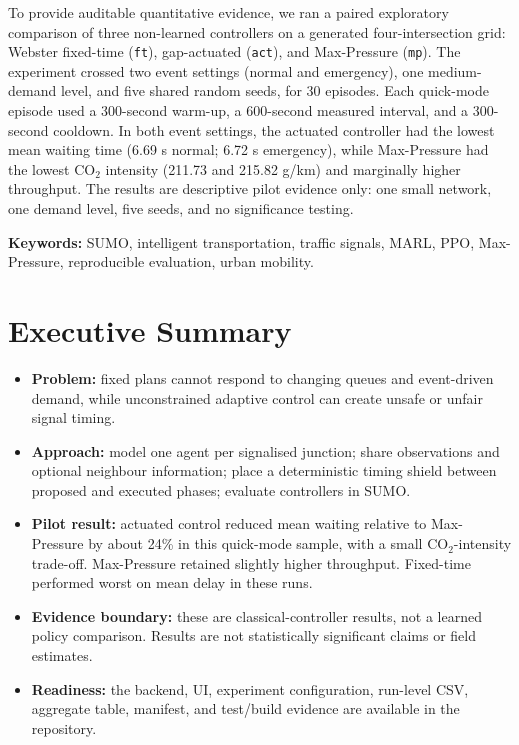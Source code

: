 \documentclass[11pt,a4paper]{article}
\begin{document}
To provide auditable quantitative evidence, we ran a paired exploratory comparison of
three non-learned controllers on a generated four-intersection grid: Webster fixed-time
(\texttt{ft}), gap-actuated (\texttt{act}), and Max-Pressure (\texttt{mp}). The experiment
crossed two event settings (normal and emergency), one medium-demand level, and five
shared random seeds, for 30 episodes. Each quick-mode episode used a 300-second warm-up,
a 600-second measured interval, and a 300-second cooldown. In both event settings, the
actuated controller had the lowest mean waiting time (6.69 s normal; 6.72 s emergency),
while Max-Pressure had the lowest CO$_2$ intensity (211.73 and 215.82 g/km) and marginally
higher throughput. The results are descriptive pilot evidence only: one small network,
one demand level, five seeds, and no significance testing.

\noindent\textbf{Keywords:} SUMO, intelligent transportation, traffic signals, MARL, PPO,
Max-Pressure, reproducible evaluation, urban mobility.

\section*{Executive Summary}
\begin{itemize}
  \item \textbf{Problem:} fixed plans cannot respond to changing queues and event-driven
  demand, while unconstrained adaptive control can create unsafe or unfair signal timing.
  \item \textbf{Approach:} model one agent per signalised junction; share observations and
  optional neighbour information; place a deterministic timing shield between proposed
  and executed phases; evaluate controllers in SUMO.
  \item \textbf{Pilot result:} actuated control reduced mean waiting relative to
  Max-Pressure by about 24\% in this quick-mode sample, with a small CO$_2$-intensity
  trade-off. Max-Pressure retained slightly higher throughput. Fixed-time performed
  worst on mean delay in these runs.
  \item \textbf{Evidence boundary:} these are classical-controller results, not a learned
  policy comparison. Results are not statistically significant claims or field estimates.
  \item \textbf{Readiness:} the backend, UI, experiment configuration, run-level CSV,
  aggregate table, manifest, and test/build evidence are available in the repository.
\end{itemize}
\end{document}
